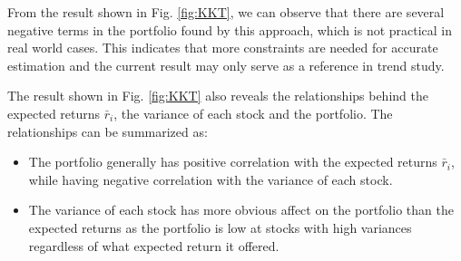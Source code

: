 \documentclass[12pt]{ftec2101}
\begin{document}
From the result shown in Fig. \ref{fig:KKT}, we can observe that there are several negative terms in the portfolio found by this approach, which is not practical in real world cases. This indicates that more constraints are needed for accurate estimation and the current result may only serve as a reference in trend study.

The result shown in Fig. \ref{fig:KKT} also reveals the relationships behind the expected returns $\bar{r}_i$, the variance of each stock and the portfolio. The relationships can be summarized as:
\begin{itemize}
    \item The portfolio generally has positive correlation with the expected returns $\bar{r}_i$, while having negative correlation with the variance of each stock.
    \item The variance of each stock has more obvious affect on the portfolio than the expected returns as the portfolio is low at stocks with high variances regardless of what expected return it offered.
\end{itemize}
\end{document}
